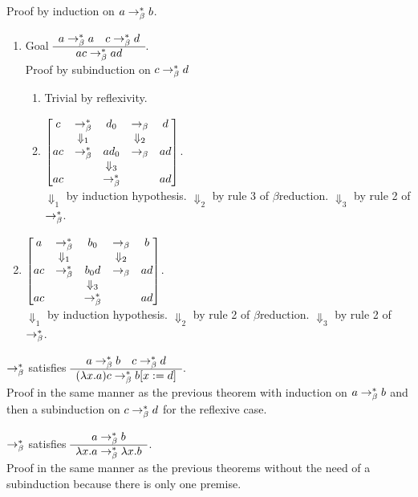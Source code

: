 \begin{theorem}
Proof by induction on $a \to^*_\beta b$.
\begin{enumerate}
\item
  Goal $\begin{array}{c} 
    a  \to^*_\beta a \quad
    c  \to^*_\beta d \\ \hline ac \to^*_\beta ad\end{array}$.\\
  Proof by subinduction on $c \to^*_\beta d$
  \begin{enumerate}
  \item
    Trivial by reflexivity.
  \item
    $\begin{bmatrix}
      c   & \to^*_\beta      &  d_0  & \to_\beta            &   d   \\
           & \Downarrow_1 &         & \Downarrow_2 &        \\
      ac & \to^*_\beta    & ad_0 & \to_\beta              &   ad \\
          &                       & \Downarrow_3 &           &        \\
      ac &                      & \to^*_\beta   &              &   ad
    \end{bmatrix}$.\\
    $\Downarrow_1$ by induction hypothesis.
    $\Downarrow_2$ by rule 3 of $\beta$reduction.
    $\Downarrow_3$ by rule 2 of $\to^*_\beta$.
  \end{enumerate}
  \item
    $\begin{bmatrix}
      a   & \to^*_\beta      &  b_0  & \to_\beta            &   b   \\
           & \Downarrow_1 &         & \Downarrow_2 &        \\
      ac & \to^*_\beta      & b_0d & \to_\beta            &   ad \\
           &                        & \Downarrow_3 &         &        \\
      ac &                         & \to^*_\beta   &           &   ad
    \end{bmatrix}$.\\
    $\Downarrow_1$ by induction hypothesis.
    $\Downarrow_2$ by rule 2 of $\beta$reduction.
    $\Downarrow_3$ by rule 2 of $\to^*_\beta$.
  \end{enumerate}
\end{theorem}




\begin{theorem}
  $\to^*_\beta$ satisfies
  $\begin{array}{c} 
    a\to^*_\beta b \quad
    c \to^*_\beta d \\ \hline (\lambda x.a)c \to^*_\beta b[x:=d]\end{array}$.
  \\ Proof in the same manner as the previous theorem with induction on
  $a\to^*_\beta b$ and then a subinduction on $c \to^*_\beta d$ for the
  reflexive case.
\end{theorem}


\begin{theorem}
  $\to^*_\beta$ satisfies
  $\begin{array}{c} 
    a\to^*_\beta b \\ \hline \lambda x.a \to^*_\beta \lambda x.b\end{array}$.\\
Proof in the same manner as the previous theorems without the need of a
subinduction because there is only one premise.
\end{theorem}

